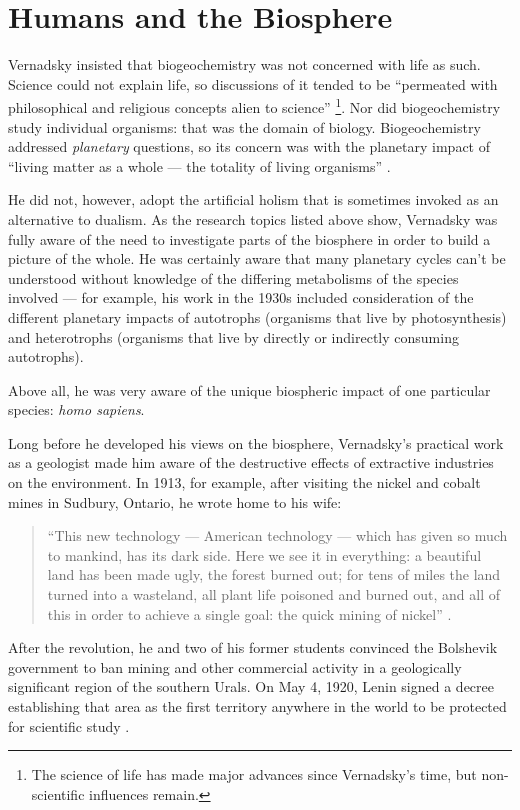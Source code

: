 \documentclass[11pt,a4paper]{article}
\begin{document}
\section*{Humans and the Biosphere}

Vernadsky insisted that biogeochemistry was not concerned with life as such.
Science could not explain life, so discussions of it tended to be “permeated
with philosophical and religious concepts alien to science”
\cite[p. 51]{6}\footnote{The science of life has made major advances since
  Vernadsky’s time, but non-scientific influences remain.}.  Nor did
biogeochemistry study individual organisms: that was the domain of biology.
Biogeochemistry addressed \emph{planetary} questions, so its concern was with
the planetary impact of “living matter as a whole — the totality of living
organisms” \cite[p. 58]{6}.

He did not, however, adopt the artificial holism that is sometimes invoked as
an alternative to dualism. As the research topics listed above show, Vernadsky
was fully aware of the need to investigate parts of the biosphere in order to
build a picture of the whole. He was certainly aware that many planetary
cycles can’t be understood without knowledge of the differing metabolisms of
the species involved — for example, his work in the 1930s included
consideration of the different planetary impacts of autotrophs (organisms that
live by photosynthesis) and heterotrophs (organisms that live by directly or
indirectly consuming autotrophs).

Above all, he was very aware of the unique biospheric impact of one particular
species: \emph{homo sapiens}.

Long before he developed his views on the biosphere, Vernadsky’s practical
work as a geologist made him aware of the destructive effects of extractive
industries on the environment. In 1913, for example, after visiting the nickel
and cobalt mines in Sudbury, Ontario, he wrote home to his wife:
\begin{quote}
  “This new technology — American technology — which has given so much to
  mankind, has its dark side. Here we see it in everything: a beautiful land
  has been made ugly, the forest burned out; for tens of miles the land turned
  into a wasteland, all plant life poisoned and burned out, and all of this in
  order to achieve a single goal: the quick mining of nickel” \cite{14}.
\end{quote}
After the revolution, he and two of his former students convinced the
Bolshevik government to ban mining and other commercial activity in a
geologically significant region of the southern Urals. On May 4, 1920, Lenin
signed a decree establishing that area as the first territory anywhere in the
world to be protected for scientific study \cite[p. 29]{15}.
\end{document}
